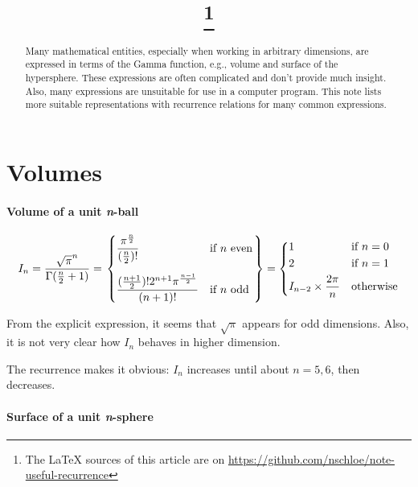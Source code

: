 \documentclass{scrartcl}
\title{\mytitle\footnote{The LaTeX sources of this article are on \url{https://github.com/nschloe/note-useful-recurrence}}}
\author{\myauthor}
\begin{document}
\maketitle
\begin{abstract}
  Many mathematical entities, especially when working in arbitrary dimensions, are
  expressed in terms of the Gamma function, e.g., volume and surface of the hypersphere.
  These expressions are often complicated and don't provide much insight. Also, many
  expressions are unsuitable for use in a computer program. This note lists more
  suitable representations with recurrence relations for many common expressions.
\end{abstract}


\section{Volumes}

\paragraph{Volume of a unit \textit{n}-ball}

\[
  I_n
  = \frac{\sqrt{\pi}^n}{\Gamma(\frac{n}{2}+1)}
  = \begin{rcases}
    \begin{dcases}
      \frac{\pi^{\frac{n}{2}}}{(\frac{n}{2})!}&\text{if $n$ even}\\[1.2ex]
      \frac{(\frac{n+1}{2})!2^{n+1}\pi^{\frac{n-1}{2}}}{\left(n+1\right)!}&\text{if $n$ odd}
  \end{dcases}
  \end{rcases}
  = \begin{dcases}
     1&\text{if $n = 0$}\\
     2&\text{if $n = 1$}\\
     I_{n-2} \times \frac{2\pi}{n}&\text{otherwise}
  \end{dcases}
\]

From the explicit expression, it seems that $\sqrt{\pi}$ appears for odd dimensions.
Also, it is not very clear how $I_n$ behaves in higher dimension.

The recurrence makes it obvious: $I_n$ increases until about $n=5,6$, then decreases.


\paragraph{Surface of a unit \textit{n}-sphere}
\end{document}
